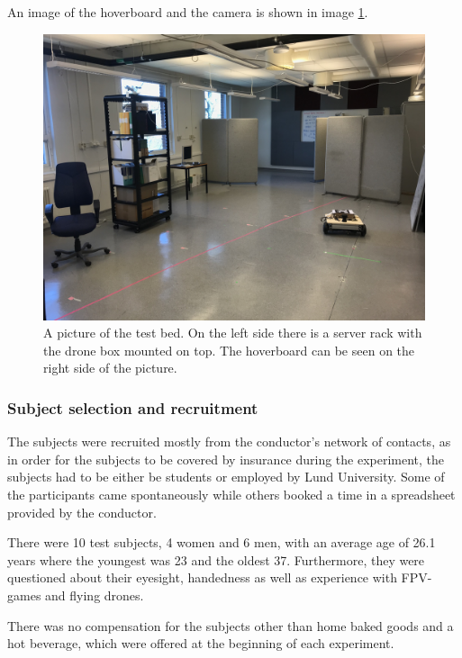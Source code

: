 \documentclass[nofilelist]{cslthse-msc}
\begin{document}
An image of the hoverboard and the camera is shown in image \ref{fig:real-exp}.

\begin{figure}[!hbt]
   \centering
   \includegraphics[scale=0.1]{images/testbed.jpg} 
   \caption{A picture of the test bed. On the left side there is a server rack with the drone box mounted on top. The hoverboard can be seen on the right side of the picture.}
   \label{fig:real-exp}
\end{figure}

\subsubsection{Subject selection and recruitment}
The subjects were recruited mostly from the conductor's network of contacts, as in order for the subjects to be covered by insurance during the experiment, the subjects had to be either be students or employed by Lund University. Some of the participants came spontaneously while others booked a time in a spreadsheet provided by the conductor.

There were 10 test subjects, 4 women and 6 men, with an average age of 26.1 years where the youngest was 23 and the oldest 37. Furthermore, they were questioned about their eyesight, handedness as well as experience with FPV-games and flying drones.

There was no compensation for the subjects other than home baked goods and a hot beverage, which were offered at the beginning of each experiment. 
\end{document}
